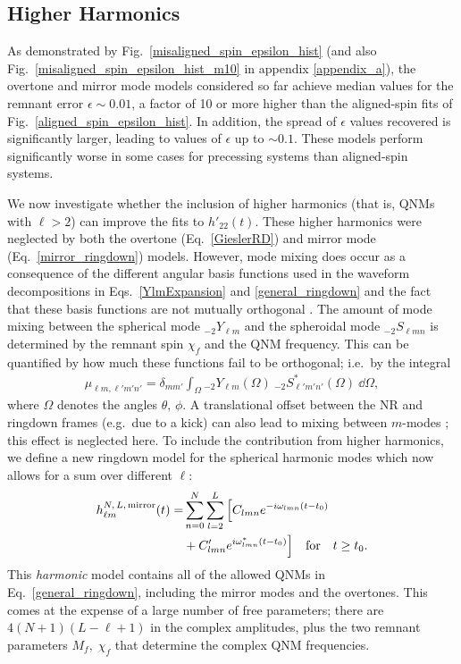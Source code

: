 \subsection{Higher Harmonics}\label{kitchen-sink}

As demonstrated by Fig.~\ref{misaligned_spin_epsilon_hist} (and also Fig.~\ref{misaligned_spin_epsilon_hist_m10} in appendix \ref{appendix_a}), the overtone and mirror mode models considered so far achieve median values for the remnant error $\epsilon \sim 0.01$, a factor of 10 or more higher than the aligned-spin fits of Fig.~\ref{aligned_spin_epsilon_hist}. In addition, the spread of $\epsilon$ values recovered is significantly larger, leading to values of $\epsilon$ up to $\sim 0.1$. 
These models perform significantly worse in some cases for precessing systems than aligned-spin systems.

We now investigate whether the inclusion of higher harmonics (that is, QNMs with $\ell > 2$) can improve the fits to $h'_{22}(t)$.
These higher harmonics were neglected by both the overtone (Eq.~\ref{GieslerRD}) and mirror mode (Eq.~\ref{mirror_ringdown}) models.
However, mode mixing does occur as a consequence of the different angular basis functions used in the waveform decompositions in Eqs.~\ref{YlmExpansion} and \ref{general_ringdown} and the fact that these basis functions are not mutually orthogonal \cite{Berti:2014fga}.
The amount of mode mixing between the spherical mode ${}_{-2}Y_{\ell m}$ and the spheroidal mode ${}_{-2}S_{\ell m n}$ is determined by the remnant spin $\chi_f$ and the QNM frequency. This can be quantified by how much these functions fail to be orthogonal; i.e.\ by the integral
\begin{align}
     \mu_{\ell m, \ell' m' n'} = \delta_{mm'}\int_{\Omega} {}_{-2}Y_{\ell m}(\Omega)  ~ {}_{-2}S^*_{\ell ' m' n'}(\Omega) ~ \dd{\Omega},
\end{align}
where $\Omega$ denotes the angles $\theta,\,\phi$.
A translational offset between the NR and ringdown frames (e.g.\ due to a kick) can also lead to mixing between $m$-modes \cite{Boyle:2015nqa}; this effect is neglected here.
To include the contribution from higher harmonics, we define a new ringdown model for the spherical harmonic modes which now allows for a sum over different $\ell$:
\begin{align}\label{full_ringdown}
    h_{\ell m}^{N,\,L,\, {\rm mirror}}(t) = &\sum_{n=0}^N \sum_{l=2}^{L} \Big[ C_{l m n} e^{-i \omega_{l m n}(t-t_0)} \\ &+ C'_{l m n} e^{i \omega^*_{l m n}(t-t_0)} \Big]\quad \textrm{for} \quad t \geq t_0. \nonumber
\end{align}
This \emph{harmonic} model contains all of the allowed QNMs in Eq.~\ref{general_ringdown}, including the mirror modes and the overtones.
This comes at the expense of a large number of free parameters; there are $4(N+1)(L-\ell+1)$ in the complex amplitudes, plus the two remnant parameters $M_f,\; \chi_f$ that determine the complex QNM frequencies.


